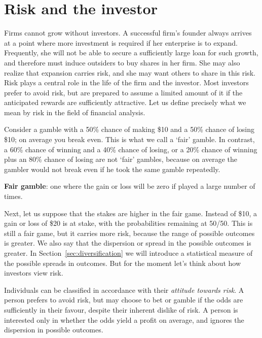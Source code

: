 \section{Risk and the investor}\label{sec:ch7sec3}

Firms cannot grow without investors. A successful firm's founder always arrives at a point where more investment is required if her enterprise is to expand. Frequently, she will not be able to secure a sufficiently large loan for such growth, and therefore must induce outsiders to buy shares in her firm. She may also realize that expansion carries risk, and she may want others to share in this risk. Risk plays a central role in the life of the firm and the investor. Most investors prefer to avoid risk, but are prepared to assume a limited amount of it if the anticipated rewards are sufficiently attractive. Let us define precisely what we mean by risk in the field of financial analysis.

Consider a gamble with a 50\% chance of making \$10 and a 50\% chance of losing \$10; on average you break even. This is what we call a `fair' gamble. In contrast, a 60\% chance of winning and a 40\% chance of losing, or a 20\% chance of winning plus an 80\% chance of losing are not `fair' gambles, because on average the gambler would not break even if he took the same gamble repeatedly. 

\begin{DefBox}
\textbf{Fair gamble}: one where the gain or loss will be zero if played a large number of times.
\end{DefBox}

Next, let us suppose that the stakes are higher in the fair game. Instead of \$10, a gain or loss of \$20 is at stake, with the probabilities remaining at 50/50. This is still a fair game, but it carries more risk, because the range of possible outcomes is greater. We also say that the dispersion or spread in the possible outcomes is greater. In Section~\ref{sec:diversification} we will introduce a statistical measure of the possible spreads in outcomes. But for the moment let's think about how investors view risk.

Individuals can be classified in accordance with their \textit{attitude towards risk}. A  person prefers to avoid risk, but may choose to bet or gamble if the odds are sufficiently in their favour, despite their inherent dislike of risk. A  person is interested only in whether the odds yield a profit on average, and ignores the dispersion in possible outcomes.

